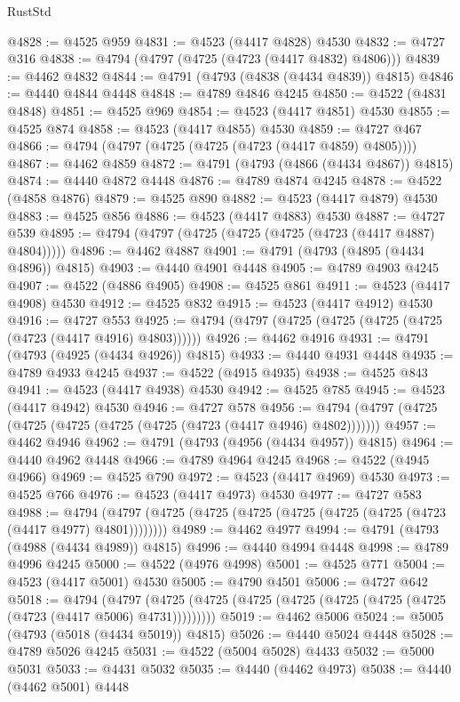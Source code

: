 \begin{lexlean}{RustStd}
\begin{coremodule}
@4828 := @4525 @959
@4831 := @4523 (@4417 @4828) @4530
@4832 := @4727 @316
@4838 := @4794 (@4797 (@4725 (@4723 (@4417 @4832) @4806)))
@4839 := @4462 @4832
@4844 := @4791 (@4793 (@4838 (@4434 @4839)) @4815)
@4846 := @4440 @4844 @4448
@4848 := @4789 @4846 @4245
@4850 := @4522 (@4831 @4848)
@4851 := @4525 @969
@4854 := @4523 (@4417 @4851) @4530
@4855 := @4525 @874
@4858 := @4523 (@4417 @4855) @4530
@4859 := @4727 @467
@4866 := @4794 (@4797 (@4725 (@4725 (@4723 (@4417 @4859) @4805))))
@4867 := @4462 @4859
@4872 := @4791 (@4793 (@4866 (@4434 @4867)) @4815)
@4874 := @4440 @4872 @4448
@4876 := @4789 @4874 @4245
@4878 := @4522 (@4858 @4876)
@4879 := @4525 @890
@4882 := @4523 (@4417 @4879) @4530
@4883 := @4525 @856
@4886 := @4523 (@4417 @4883) @4530
@4887 := @4727 @539
@4895 := @4794 (@4797 (@4725 (@4725 (@4725 (@4723 (@4417 @4887) @4804)))))
@4896 := @4462 @4887
@4901 := @4791 (@4793 (@4895 (@4434 @4896)) @4815)
@4903 := @4440 @4901 @4448
@4905 := @4789 @4903 @4245
@4907 := @4522 (@4886 @4905)
@4908 := @4525 @861
@4911 := @4523 (@4417 @4908) @4530
@4912 := @4525 @832
@4915 := @4523 (@4417 @4912) @4530
@4916 := @4727 @553
@4925 := @4794 (@4797 (@4725 (@4725 (@4725 (@4725 (@4723 (@4417 @4916) @4803))))))
@4926 := @4462 @4916
@4931 := @4791 (@4793 (@4925 (@4434 @4926)) @4815)
@4933 := @4440 @4931 @4448
@4935 := @4789 @4933 @4245
@4937 := @4522 (@4915 @4935)
@4938 := @4525 @843
@4941 := @4523 (@4417 @4938) @4530
@4942 := @4525 @785
@4945 := @4523 (@4417 @4942) @4530
@4946 := @4727 @578
@4956 := @4794 (@4797 (@4725 (@4725 (@4725 (@4725 (@4725 (@4723 (@4417 @4946) @4802)))))))
@4957 := @4462 @4946
@4962 := @4791 (@4793 (@4956 (@4434 @4957)) @4815)
@4964 := @4440 @4962 @4448
@4966 := @4789 @4964 @4245
@4968 := @4522 (@4945 @4966)
@4969 := @4525 @790
@4972 := @4523 (@4417 @4969) @4530
@4973 := @4525 @766
@4976 := @4523 (@4417 @4973) @4530
@4977 := @4727 @583
@4988 := @4794 (@4797 (@4725 (@4725 (@4725 (@4725 (@4725 (@4725 (@4723 (@4417 @4977) @4801))))))))
@4989 := @4462 @4977
@4994 := @4791 (@4793 (@4988 (@4434 @4989)) @4815)
@4996 := @4440 @4994 @4448
@4998 := @4789 @4996 @4245
@5000 := @4522 (@4976 @4998)
@5001 := @4525 @771
@5004 := @4523 (@4417 @5001) @4530
@5005 := @4790 @4501
@5006 := @4727 @642
@5018 := @4794
    (@4797 (@4725 (@4725 (@4725 (@4725 (@4725 (@4725 (@4725 (@4723 (@4417 @5006) @4731)))))))))
@5019 := @4462 @5006
@5024 := @5005 (@4793 (@5018 (@4434 @5019)) @4815)
@5026 := @4440 @5024 @4448
@5028 := @4789 @5026 @4245
@5031 := @4522 (@5004 @5028) @4433
@5032 := @5000 @5031
@5033 := @4431 @5032
@5035 := @4440 (@4462 @4973)
@5038 := @4440 (@4462 @5001) @4448

\end{coremodule}
\end{lexlean}
